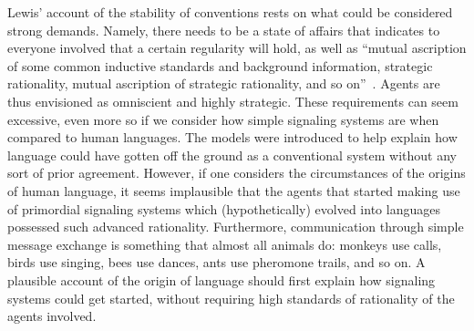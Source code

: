\documentclass[a4paper]{article}
\begin{document}
Lewis' account of the stability of conventions rests on what could be considered strong demands. %
Namely, there needs to be a state of affairs that indicates to everyone involved that a certain regularity will hold, as well as ``mutual ascription of some common inductive standards and background information, strategic rationality, mutual ascription of strategic rationality, and so on''~\parencite*[56--57]{lewis_convention_1969}.
Agents are thus envisioned as omniscient and highly strategic.
These requirements can seem excessive, even more so if we consider how simple signaling systems are when compared to human languages.
The models were introduced to help explain how language could have gotten off the ground as a conventional system without any sort of prior agreement.
However, if one considers the circumstances of the origins of human language, it seems implausible that the agents that started making use of primordial signaling systems which (hypothetically) evolved into languages possessed such advanced rationality.
Furthermore, communication through simple message exchange is something that almost all animals do: monkeys use calls, birds use singing, bees use dances, ants use pheromone trails, and so on.
A plausible account of the origin of language should first explain how signaling systems could get started, without requiring high standards of rationality of the agents involved.
\end{document}
